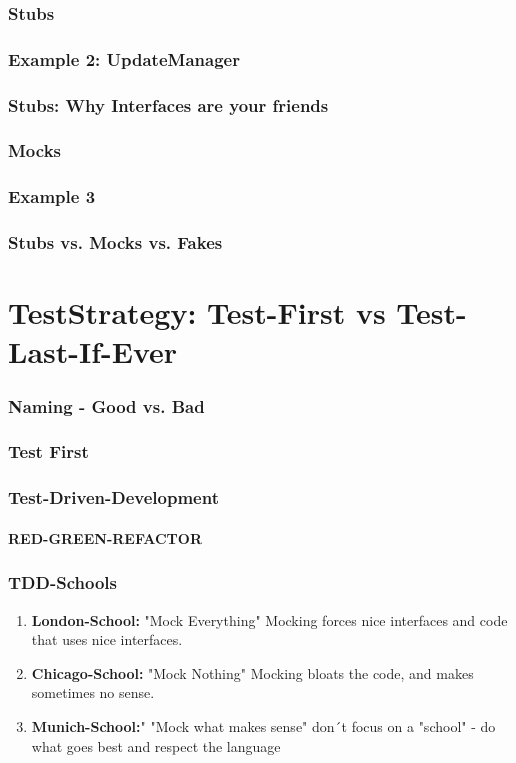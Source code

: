 \documentclass[12pt]{beamer}
\begin{document}
	\begin{frame}
		\frametitle{Stubs}
	\end{frame}

	\begin{frame}
		\frametitle{Example 2: UpdateManager}
	\end{frame}
	
	\begin{frame}
		\frametitle{Stubs: Why Interfaces are your friends}
	\end{frame}

	\begin{frame}
		\frametitle{Mocks}
	\end{frame}

	\begin{frame}
		\frametitle{Example 3}
	\end{frame}
	
	\begin{frame}
		\frametitle{Stubs vs. Mocks vs. Fakes}
	\end{frame}
	
	\section{TestStrategy: Test-First vs Test-Last-If-Ever}
	
	\begin{frame}
		\frametitle{Naming - Good vs. Bad}
	\end{frame}
	
	\begin{frame}
		\frametitle{Test First}
	\end{frame}

	\begin{frame}
		\frametitle{Test-Driven-Development}
		\framesubtitle{RED-GREEN-REFACTOR}
	\end{frame}

	\begin{frame}
		\frametitle{TDD-Schools}
		\begin{enumerate}
			\item \textbf{London-School:} "Mock Everything" \newline Mocking forces nice interfaces and code that uses nice interfaces. 
			\item \textbf{Chicago-School:} "Mock Nothing" 
			\newline Mocking bloats the code, and makes sometimes no sense. 
			\item \textbf{Munich-School:}" "Mock what makes sense" 
			\newline don´t focus on a "school" - do what goes best and respect the language 
		\end{enumerate}
	\end{frame}
	
\end{document}
